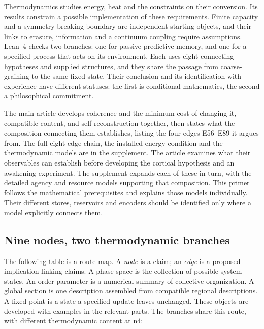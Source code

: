 \documentclass[11pt]{article}
\begin{document}
Thermodynamics studies energy, heat and the constraints on their conversion.
Its results constrain a possible implementation of these
requirements. Finite capacity and a symmetry-breaking boundary are independent
starting objects, and their links to erasure, information and a continuum
coupling require assumptions. Lean~4 checks two branches: one for passive
predictive memory, and one for a specified process that acts on its environment.
Each uses eight connecting hypotheses and supplied structures, and they share
the passage from coarse-graining to the same fixed state. Their conclusion
and its identification with experience have different statuses:
the first is conditional mathematics, the second a philosophical commitment.

The main article develops coherence and the minimum cost of changing it,
compatible content, and self-reconstruction together, then states what the
composition connecting them establishes, listing the four edges E56--E89 it
argues from. The full eight-edge chain, the installed-energy condition and the
thermodynamic models are in the supplement. The article examines what their observables can establish before
developing the cortical hypothesis and an awakening experiment. The supplement
expands each of these in turn, with the detailed agency and resource models
supporting that composition. This primer
follows the mathematical prerequisites and explains those models individually.
Their different stores, reservoirs and encoders should be identified only where
a model explicitly connects them.

\subsection{Nine nodes, two thermodynamic branches}

The following table is a route map. A \emph{node} is a claim; an \emph{edge}
is a proposed implication linking claims. A phase space is the collection of
possible system states. An order parameter is a numerical summary of collective
organization. A global section is one description assembled from compatible
regional descriptions. A fixed point is a state a specified update leaves
unchanged. These objects are developed with examples in the relevant parts.
The branches share this route, with different thermodynamic content at n4:
\end{document}
